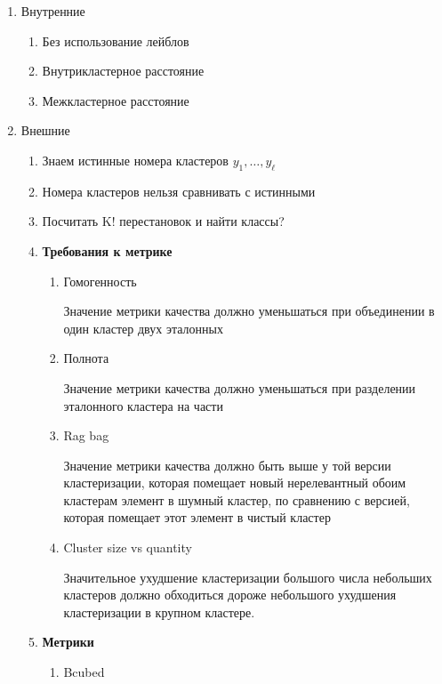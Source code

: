 \documentclass[a4paper, 12pt]{article}
\begin{document}
\begin{enumerate}
    \item Внутренние
        \begin{enumerate}
            \item Без использование лейблов
            \item Внутрикластерное расстояние
            \item Межкластерное расстояние
        \end{enumerate}
    \item Внешние
    \begin{enumerate}
        \item Знаем истинные номера кластеров $y_1, \ldots, y_{\ell}$
        \item Номера кластеров нельзя сравнивать с истинными
        \item Посчитать K! перестановок и найти классы?
        \item \textbf{Требования к метрике}
        \begin{enumerate}
            \item Гомогенность
            
            Значение метрики качества должно уменьшаться при 
            объединении в один кластер двух эталонных

            \item Полнота
            
            Значение метрики качества должно уменьшаться 
            при разделении эталонного кластера на части

            \item Rag bag
            
            Значение метрики качества должно быть выше у той версии кластеризации, 
            которая помещает новый нерелевантный обоим кластерам элемент в шумный кластер, 
            по сравнению с версией, которая помещает этот элемент в чистый кластер

            \item Cluster size vs quantity
            
            Значительное ухудшение кластеризации большого числа небольших кластеров должно обходиться дороже 
            небольшого ухудшения кластеризации в крупном кластере.
        \end{enumerate}
        \item \textbf{Метрики}
        \begin{enumerate}
            \item Bcubed
            

\end{enumerate}
\end{enumerate}
\end{enumerate}
\end{document}

